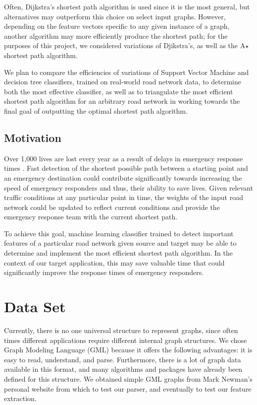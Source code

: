 \documentclass{article}
\begin{document}
Often, Dijkstra's shortest path algorithm is used since it is the most general, but alternatives may outperform this choice on select input graphs. However, depending on the feature vectors specific to any given instance of a graph, another algorithm may more efficiently produce the shortest path; for the purposes of this project, we considered variations of Djikstra's, as well as the A$\star$ shortest path algorithm.

We plan to compare the efficiencies of variations of Support Vector Machine and decision tree classifiers, trained on real-world road network data, to determine both the most effective classifier, as well as to triangulate the most efficient shortest path algorithm for an arbitrary road network in working towards the final goal of outputting the optimal shortest path algorithm. 

\subsection{Motivation}
Over 1,000 lives are lost every year as a result of delays in emergency response times . Fast detection of the shortest possible path between a starting point and an emergency destination could contribute significantly towards increasing the speed of emergency responders and thus, their ability to save lives. Given relevant traffic conditions at any particular point in time, the weights of the input road network could be updated to reflect current conditions and provide the emergency response team with the current shortest path.

To achieve this goal, machine learning classifier trained to detect important features of a particular road network given source and target may be able to determine and implement the most efficient shortest path algorithm. In the context of our target application, this may save valuable time that could significantly improve the response times of emergency responders. 

\section{Data Set}

Currently, there is no one universal structure to represent graphs, since often times different applications require different internal graph structures. We chose Graph Modeling Language (GML) because it offers the following advantages: it is easy to read, understand, and parse. Furthermore, there is a lot of graph data available in this format, and many algorithms and packages have already been defined for this structure. We obtained simple GML graphs from Mark Newman's personal website from which to test our parser, and eventually to test our feature extraction. 
\end{document}
